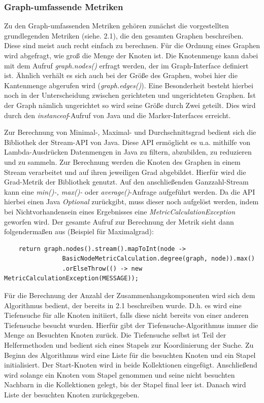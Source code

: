 \documentclass[a4paper,12pt,ngerman,chapterprefix=false,listof=totoc,bibliography=totoc]{scrreprt}
\begin{document}
{{\subsubsection*{Graph-umfassende Metriken}
{
Zu den Graph-umfassenden Metriken gehören zunächst die vorgestellten grundlegenden Metriken (siehe. 2.1), die den gesamten Graphen beschreiben. Diese sind meist auch recht einfach zu berechnen. Für die Ordnung eines Graphen wird abgefragt, wie groß die Menge der Knoten ist. Die Knotenmenge kann dabei mit dem Aufruf \textit{graph.nodes()} erfragt werden, der im Graph-Interface definiert ist. Ähnlich verhält es sich auch bei der Größe des Graphen, wobei hier die Kantenmenge abgerufen wird (\textit{graph.edges()}). Eine Besonderheit besteht hierbei noch in der Unterscheidung zwischen gerichteten und ungerichteten Graphen. Ist der Graph nämlich ungerichtet so wird seine Größe durch Zwei geteilt. Dies wird durch den \textit{instanceof}-Aufruf von Java und die Marker-Interfaces erreicht.

Zur Berechnung von Minimal-, Maximal- und Durchschnittsgrad bedient sich die Bibliothek der Stream-API von Java. Diese API ermöglicht es u.a. mithilfe von Lambda-Ausdrücken Datenmengen in Java zu filtern, abzubilden, zu reduzieren und zu sammeln. \cite{ullenboom_java_2014} Zur Berechnung werden die Knoten des Graphen in einem Stream verarbeitet und auf ihren jeweiligen Grad abgebildet. Hierfür wird die Grad-Metrik der Bibliothek genutzt. Auf den anschließenden Ganzzahl-Stream kann eine \textit{min()-, max()-} oder \textit{average()}-Anfrage aufgeführt werden. Da die API hierbei einen Java \textit{Optional} zurückgibt, muss dieser noch aufgelöst werden, indem bei Nichtvorhandensein eines Ergebnisses eine \textit{MetricCalculationException} geworfen wird. Der gesamte Aufruf zur Berechnung der Metrik sieht dann folgendermaßen aus (Beispiel für Maximalgrad):
\begin{lstlisting}
	return graph.nodes().stream().mapToInt(node ->
				BasicNodeMetricCalculation.degree(graph, node)).max()
				.orElseThrow(() -> new MetricCalculationException(MESSAGE));
\end{lstlisting}
Für die Berechnung der Anzahl der Zusammenhangskomponenten wird sich dem Algorithmus bedient, der bereits in 2.1 beschreiben wurde. D.h. es wird eine Tiefensuche für alle Knoten initiiert, falls diese nicht bereits von einer anderen Tiefensuche besucht wurden. Hierfür gibt der Tiefensuche-Algorithmus immer die Menge an Besuchten Knoten zurück. Die Tiefensuche selbst ist Teil der Helfermethoden und bedient sich eines Stapels zur Koordinierung der Suche. Zu Beginn des Algorithmus wird eine Liste für die besuchten Knoten und ein Stapel initialisiert. Der Start-Knoten wird in beide Kollektionen eingefügt. Anschließend wird solange ein Knoten vom Stapel genommen und seine nicht besuchten Nachbarn in die Kollektionen gelegt, bis der Stapel final leer ist. Danach wird Liste der besuchten Knoten zurückgegeben.

}}}
\end{document}

